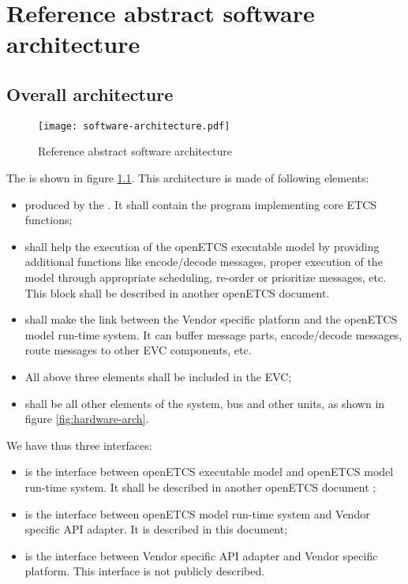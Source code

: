 \chapter{Reference abstract software architecture}
\label{software-arch}

\section{Overall architecture}

\begin{figure}[htbp]
  \centering
  \texttt{[image: software-architecture.pdf]}
  \caption{Reference abstract software architecture}
  \label{fig:software-arch}
\end{figure}

The  is shown in figure
\ref{fig:software-arch}. This architecture is made of following
elements:
\begin{itemize}
\item {} produced by the
  \cite{scade-model}. It shall contain the program implementing core
  ETCS functions;
\item {} shall help the execution
  of the openETCS executable model by providing additional functions
  like encode/decode messages, proper execution of the model through
  appropriate scheduling, re-order or prioritize messages, etc. This
  block shall be described in another openETCS document. 
\item {} shall make the link between
  the Vendor specific platform and the openETCS model run-time system.
  It can buffer message parts, encode/decode messages, route messages
  to other EVC components, etc.
\item All above three elements shall be included in the EVC;
\item {} shall be all other elements of
  the system, bus and other units, as shown in figure
  \ref{fig:hardware-arch}.
\end{itemize}

We have thus three interfaces:
\begin{itemize}
\item {} is the interface between openETCS
  executable model and openETCS model run-time system. It shall be
  described in another openETCS document ;
\item {} is the interface between openETCS model
  run-time system and Vendor specific API adapter. It is described in
  this document;
\item {} is the interface between Vendor
  specific API adapter and Vendor specific platform. This interface is
  not publicly described.
\end{itemize}

